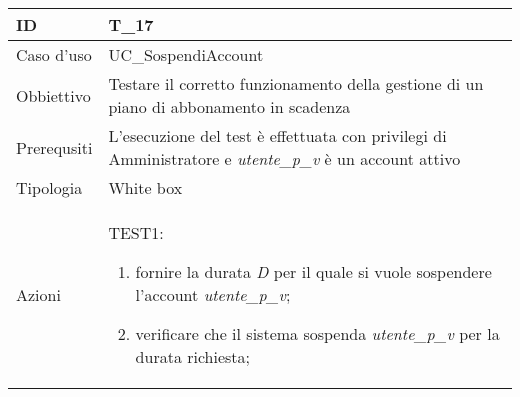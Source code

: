 \begin{table}[hb]
    \centering
    \begin{tabular}{ |p{2cm}|p{10cm}|  }
        \hline
        ID          & T\_17                                                                                                         \\\hline
        Caso d'uso  & UC\_SospendiAccount                                                                                           \\\hline
        Obbiettivo  & Testare il corretto funzionamento della gestione di un piano di abbonamento in scadenza                       \\\hline
        Prerequsiti & L'esecuzione del test è effettuata con privilegi di Amministratore e  \emph{utente\_p\_v} è un account attivo \\\hline
        Tipologia   & White box                                                                                                     \\\hline
        Azioni      &
        TEST1:
        \begin{enumerate}[nosep, topsep=0pt]
            \item fornire la durata \emph{D} per il quale si vuole sospendere l'account \emph{utente\_p\_v};
            \item verificare che il sistema sospenda \emph{utente\_p\_v} per la durata richiesta;
        \end{enumerate}

        \\\hline
    \end{tabular}
\end{table}

